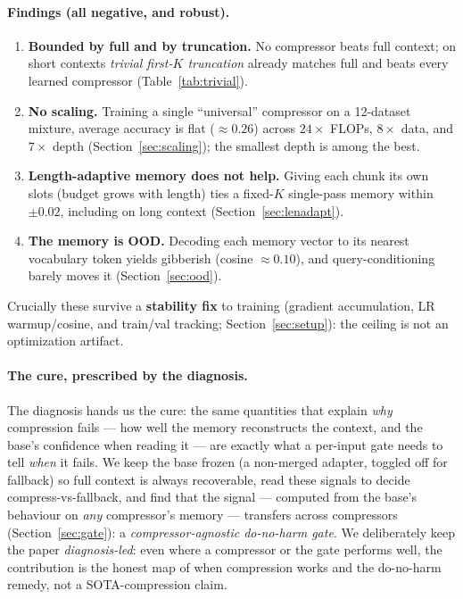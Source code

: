 \documentclass[11pt]{article}
\begin{document}
\paragraph{Findings (all negative, and robust).}
\begin{enumerate}[noitemsep]
  \item \textbf{Bounded by full and by truncation.} No compressor beats full context; on short contexts
        \emph{trivial first-$K$ truncation} already matches full and beats every learned compressor
        (Table~\ref{tab:trivial}).
  \item \textbf{No scaling.} Training a single ``universal'' compressor on a 12-dataset mixture, average
        accuracy is flat ($\approx\!0.26$) across $24\times$ FLOPs, $8\times$ data, and $7\times$ depth
        (Section~\ref{sec:scaling}); the smallest depth is among the best.
  \item \textbf{Length-adaptive memory does not help.} Giving each chunk its own slots (budget grows with
        length) ties a fixed-$K$ single-pass memory within $\pm0.02$, including on long context
        (Section~\ref{sec:lenadapt}).
  \item \textbf{The memory is OOD.} Decoding each memory vector to its nearest vocabulary token yields
        gibberish (cosine $\approx0.10$), and query-conditioning barely moves it (Section~\ref{sec:ood}).
\end{enumerate}
Crucially these survive a \textbf{stability fix} to training (gradient accumulation, LR warmup/cosine, and
train/val tracking; Section~\ref{sec:setup}): the ceiling is not an optimization artifact.

\paragraph{The cure, prescribed by the diagnosis.}
The diagnosis hands us the cure: the same quantities that explain \emph{why} compression fails --- how well the
memory reconstructs the context, and the base's confidence when reading it --- are exactly what a per-input gate
needs to tell \emph{when} it fails. We keep the base frozen (a non-merged adapter, toggled off for fallback) so
full context is always recoverable, read these signals to decide compress-vs-fallback, and find that the signal
--- computed from the base's behaviour on \emph{any} compressor's memory --- transfers across compressors
(Section~\ref{sec:gate}): a \emph{compressor-agnostic do-no-harm gate}. We deliberately keep the paper
\emph{diagnosis-led}: even where a compressor or the gate performs well, the contribution is the honest map of
when compression works and the do-no-harm remedy, not a SOTA-compression claim.
\end{document}
